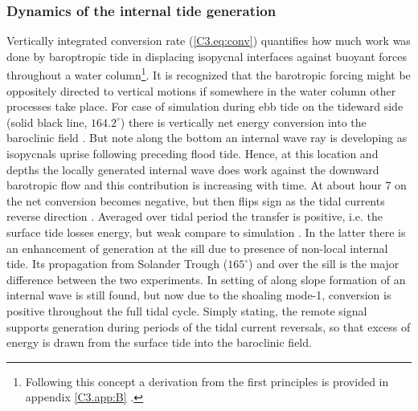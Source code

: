 \documentclass[12pt]{article}
\begin{document}
\subsubsection{Dynamics of the internal tide generation}
Vertically integrated conversion rate (\ref{C3.eq:conv}) quantifies how much work was done by 
baroptropic tide in displacing isopycnal interfaces against buoyant forces throughout a water 
column\footnote{Following this concept a derivation from the first principles is provided in 
appendix 
\ref{C3.app:B} \citep{kurapov2003m, kelly2010topo}.}. It is recognized 
that 
the barotropic forcing might be oppositely directed to vertical motions if somewhere in the 
water column other processes take place. For case of  simulation 
during ebb tide on the tideward side (solid black line, $164.2^{\circ}$) there is vertically net 
energy 
conversion into the baroclinic field . But note along the bottom an 
internal wave ray is developing as isopycnals uprise following preceding flood tide. 
Hence, at this location and depths the locally generated internal wave does work against the 
downward barotropic flow and this contribution is increasing with time. At about hour 7 on 
 the net conversion becomes negative, but then flips sign as the 
tidal currents reverse direction . Averaged over tidal period the 
transfer is positive, i.e. the surface tide losses energy, but weak compare to  
simulation 
. In the latter there is an enhancement of generation at the sill due 
to presence of non-local internal tide. Its propagation from Solander Trough ($165^{\circ}$) and 
over the sill is the major difference between the two experiments. In setting of  
along slope formation of an internal wave is still found, but now due to the shoaling 
mode-1, conversion is positive throughout the full tidal cycle. Simply stating, the remote signal 
supports 
generation during periods of the tidal current reversals, so that excess of energy is drawn from 
the surface tide into the baroclinic field.\\
\end{document}
